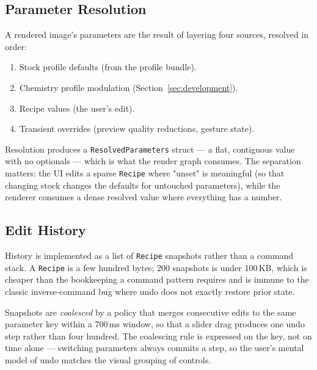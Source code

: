 \subsection{Parameter Resolution}

A rendered image's parameters are the result of layering four sources, resolved
in order:

\begin{enumerate}
\item Stock profile defaults (from the profile bundle).
\item Chemistry profile modulation (Section~\ref{sec:development}).
\item Recipe values (the user's edit).
\item Transient overrides (preview quality reductions, gesture state).
\end{enumerate}

Resolution produces a \texttt{ResolvedParameters} struct --- a flat, contiguous
value with no optionals --- which is what the render graph consumes. The
separation matters: the UI edits a sparse \texttt{Recipe} where "unset" is
meaningful (so that changing stock changes the defaults for untouched
parameters), while the renderer consumes a dense resolved value where everything
has a number.

\subsection{Edit History}

History is implemented as a list of \texttt{Recipe} snapshots rather than a
command stack. A \texttt{Recipe} is a few hundred bytes; 200 snapshots is under
100\,KB, which is cheaper than the bookkeeping a command pattern requires and is
immune to the classic inverse-command bug where undo does not exactly restore
prior state.

Snapshots are \emph{coalesced} by a policy that merges consecutive edits to the
same parameter key within a 700\,ms window, so that a slider drag produces one
undo step rather than four hundred. The coalescing rule is expressed on the key,
not on time alone --- switching parameters always commits a step, so the user's
mental model of undo matches the visual grouping of controls.


